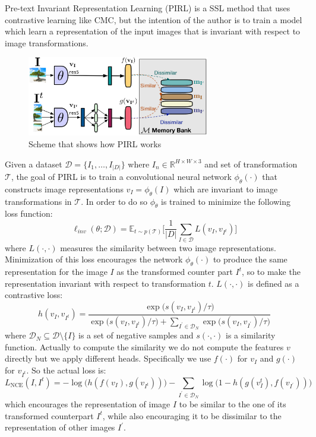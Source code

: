Pre-text Invariant Representation Learning (PIRL) \cite{misra2020self} is a SSL method that uses contrastive learning like CMC, but the intention of the author is to train a model which learn a representation of the input images that is invariant with respect to image transformations.
\begin{figure}[H]
	\centering
	\includegraphics[width=8cm]{./images/pirl_scheme.png}
	\caption{Scheme that shows how PIRL works}
	\label{fig:pirl_scheme}
\end{figure}
\noindent Given a dataset $\mathcal{D} = \{I_1, \dots ,I_{|D|}\}$ where $I_n \in \mathbb{R}^{H\times W\times3}$ and set of transformation $\mathcal{T}$, the goal of PIRL is to train a convolutional neural network $\phi_\theta(\cdot)$ that constructs image representations $v_I = \phi_\theta(I)$ which are invariant to image transformations in $\mathcal{T}$. In order to do so $\phi_\theta$ is trained to minimize the following loss function:
\[ \ell_{inv}(\theta;\mathcal{D}) = \mathbb{E}_{t \sim p(\mathcal{T})}\Bigg[ \frac{1}{|D|} \sum_{I \in \mathcal{D}} L(v_I, v_{I^t}) \Bigg] \]
where $L(\cdot, \cdot)$ measures the similarity between two image representations. Minimization of this loss encourages the network $\phi_\theta(\cdot)$ to produce the same representation for the image $I$ as the transformed counter part $I^t$, so to make the representation invariant with respect to transformation $t$. $L(\cdot, \cdot)$ is defined as a contrastive loss:
\[h(v_I, v_{I^t}) = \frac{ \exp\Big(s(v_I, v_{I^t})/\tau \Big)}{ \exp\Big(s(v_I, v_{I^t})/\tau\Big) + \sum_{I^\prime \in \mathcal{D}_N}\exp\Big(s(v_I, v_{I^\prime})/\tau\Big)}\]
where $\mathcal{D}_N \subseteq \mathcal{D} \setminus \{I\}$ is a set of negative samples and $s(\cdot, \cdot)$ is a similarity function. Actually to compute the similarity we do not compute the features $v$ directly but we apply different heads. Specifically we use $f(\cdot)$ for $v_I$ and $g(\cdot)$ for $v_{I^t}$. So the actual loss is:
\[L_{\text{NCE}}(I, I^t) = -\log\big(h(f(v_I), g(v_{I^t}))\big) - \sum_{I^\prime \in \mathcal{D}_N} \log\big(1 - h(g(v^t_I), f(v_{I^\prime}))\big) \]
which encourages the representation of image $I$ to be similar to the one of its transformed counterpart $I^t$, while also encouraging it to be dissimilar to the representation of other images $I^\prime$.

